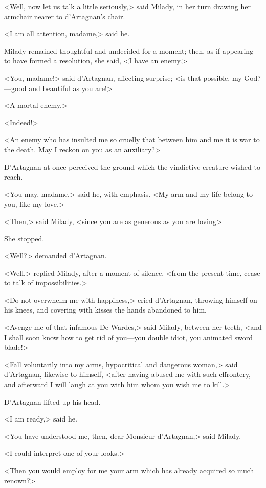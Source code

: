 <Well, now let us talk a little seriously,> said Milady, in her turn drawing her armchair nearer to d'Artagnan's chair. 

<I am all attention, madame,> said he. 

Milady remained thoughtful and undecided for a moment; then, as if appearing to have formed a resolution, she said, <I have an enemy.> 

<You, madame!> said d'Artagnan, affecting surprise; <is that possible, my God?---good and beautiful as you are!> 

<A mortal enemy.> 

<Indeed!> 

<An enemy who has insulted me so cruelly that between him and me it is war to the death. May I reckon on you as an auxiliary?> 

D'Artagnan at once perceived the ground which the vindictive creature wished to reach. 

<You may, madame,> said he, with emphasis. <My arm and my life belong to you, like my love.> 

<Then,> said Milady, <since you are as generous as you are loving\longdash> 

She stopped. 

<Well?> demanded d'Artagnan. 

<Well,> replied Milady, after a moment of silence, <from the present time, cease to talk of impossibilities.> 

<Do not overwhelm me with happiness,> cried d'Artagnan, throwing himself on his knees, and covering with kisses the hands abandoned to him. 

<Avenge me of that infamous De Wardes,> said Milady, between her teeth, <and I shall soon know how to get rid of you---you double idiot, you animated sword blade!> 

<Fall voluntarily into my arms, hypocritical and dangerous woman,> said d'Artagnan, likewise to himself, <after having abused me with such effrontery, and afterward I will laugh at you with him whom you wish me to kill.> 

D'Artagnan lifted up his head. 

<I am ready,> said he. 

<You have understood me, then, dear Monsieur d'Artagnan,> said Milady. 

<I could interpret one of your looks.> 

<Then you would employ for me your arm which has already acquired so much renown?> 

